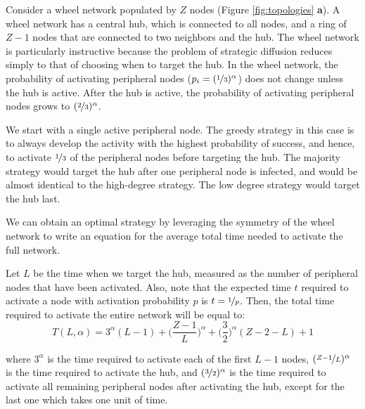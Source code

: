 \documentclass[preprint,superscriptaddress,floatfix]{article}
\begin{document}
Consider a wheel network populated by $Z$ nodes (Figure \ref{fig:topologies} \textbf{a}). A wheel network has a central hub, which is connected to all nodes, and a ring of $Z-1$ nodes that are connected to two neighbors and the hub. The wheel network is particularly instructive because the problem of strategic diffusion reduces simply to that of choosing when to target the hub. In the wheel network, the probability of activating peripheral nodes ($p_i=(\nicefrac{1}{3})^\alpha$) does not change unless the hub is active. After the hub is active, the probability of activating peripheral nodes grows to  $(\nicefrac{2}{3})^\alpha$. 

We start with a single active peripheral node. The greedy strategy in this case is to always develop the activity with the highest probability of success, and hence, to activate $\nicefrac{1}{3}$ of the peripheral nodes before targeting the hub. The majority strategy would target the hub after one peripheral node is infected, and would be almost identical to the high-degree strategy. The low degree strategy would target the hub last.

We can obtain an optimal strategy by leveraging the symmetry of the wheel network to write an equation for the average total time needed to activate the full network. 

Let $L$ be the time when we target the hub, measured as the number of peripheral nodes that have been activated. Also, note that the expected time $t$ required to activate a node with activation probability $p$ is $t=\nicefrac{1}{p}$. Then, the total time required to activate the entire network will be equal to:
\begin{equation}
    T(L,\alpha) =3^\alpha(L-1) + \bigg(\frac{Z-1}{L}\bigg)^\alpha +\bigg(\frac{3}{2}\bigg)^\alpha(Z-2-L) + 1
\label{wheelequation}
\end{equation}

where $3^\alpha$ is the time required to activate each of the first $L-1$ nodes, $(\nicefrac{Z-1}{L})^\alpha$ is the time required to activate the hub, and $(\nicefrac{3}{2})^\alpha$ is the time required to activate all remaining peripheral nodes after activating the hub, except for the last one which takes one unit of time.
\end{document}
